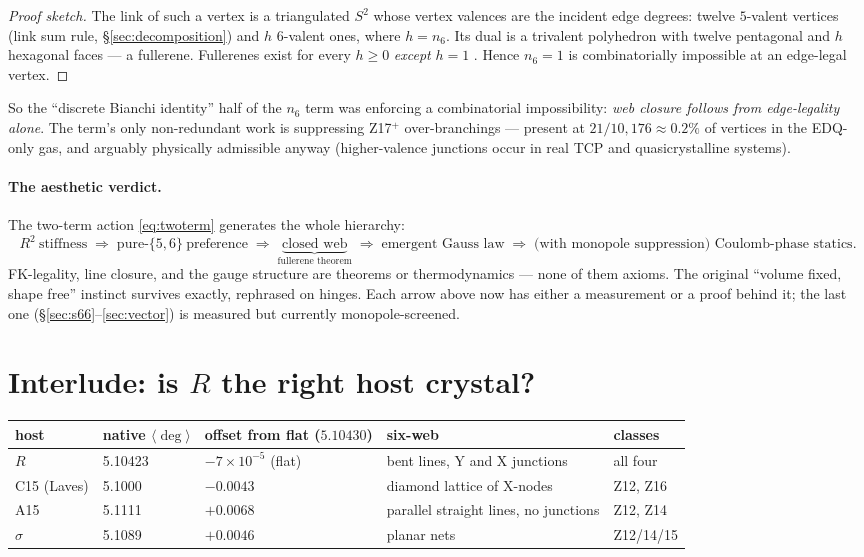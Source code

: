 \documentclass[11pt]{article}
\newcommand{\Nfk}{n_6}
\begin{document}
\begin{proof}[Proof sketch]
The link of such a vertex is a triangulated $S^2$ whose vertex valences are
the incident edge degrees: twelve $5$-valent vertices (link sum rule,
\S\ref{sec:decomposition}) and $h$ $6$-valent ones, where $h = \Nfk$. Its
dual is a trivalent polyhedron with twelve pentagonal and $h$ hexagonal
faces --- a fullerene. Fullerenes exist for every $h \geq 0$ \emph{except}
$h = 1$ \cite{grunbaum-motzkin}. Hence $\Nfk = 1$ is combinatorially
impossible at an edge-legal vertex.
\end{proof}

So the ``discrete Bianchi identity'' half of the $n_6$ term was enforcing a
combinatorial impossibility: \emph{web closure follows from edge-legality
alone}. The term's only non-redundant work is suppressing Z17$^+$
over-branchings --- present at $21/10{,}176 \approx 0.2\%$ of vertices in
the EDQ-only gas, and arguably physically admissible anyway (higher-valence
junctions occur in real TCP and quasicrystalline systems).

\paragraph{The aesthetic verdict.}
The two-term action \eqref{eq:twoterm} generates the whole hierarchy:
\[
R^2\ \text{stiffness}
\;\Rightarrow\; \text{pure-}\{5,6\}\ \text{preference}
\;\Rightarrow\; \underbrace{\text{closed web}}_{\text{fullerene theorem}}
\;\Rightarrow\; \text{emergent Gauss law}
\;\Rightarrow\; \text{(with monopole suppression) Coulomb-phase statics.}
\]
FK-legality, line closure, and the gauge structure are theorems or
thermodynamics --- none of them axioms. The original ``volume fixed, shape
free'' instinct survives exactly, rephrased on hinges. Each arrow above now
has either a measurement or a proof behind it; the last one
(\S\ref{sec:s66}--\ref{sec:vector}) is measured but currently
monopole-screened.

\section{Interlude: is $R$ the right host crystal?}
\label{sec:host}

\begin{center}
\begin{tabular}{lllll}
\toprule
host & native $\langle\deg\rangle$ & offset from flat ($5.10430$) & six-web & classes \\
\midrule
$R$ & 5.10423 & $-7\times10^{-5}$ (flat) & bent lines, Y and X junctions & all four \\
C15 (Laves) & 5.1000 & $-0.0043$ & diamond lattice of X-nodes & Z12, Z16 \\
A15 & 5.1111 & $+0.0068$ & parallel straight lines, no junctions & Z12, Z14 \\
$\sigma$ & 5.1089 & $+0.0046$ & planar nets & Z12/14/15 \\
\bottomrule
\end{tabular}
\end{center}
\end{document}
